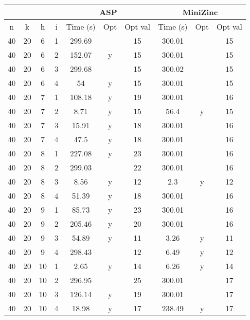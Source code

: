 \documentclass[12pt,a4paper,english,italian]{article}
\begin{document}
\begin{table}[]
	\begin{tabular}{cccc|ccc|ccc|}
		\cline{5-10}
		&    &    &   & \multicolumn{3}{c|}{ASP} & \multicolumn{3}{c|}{MiniZinc} \\ \hline
		n  & k  & h  & i & Time (s) & Opt & Opt val & Time (s)   & Opt   & Opt val  \\ \hline
		40 & 20 & 6  & 1 & 299.69   &     & 15      & 300.01     &       & 15       \\ \hline
		40 & 20 & 6  & 2 & 152.07   & y   & 15      & 300.01     &       & 15       \\ \hline
		40 & 20 & 6  & 3 & 299.68   &     & 15      & 300.02     &       & 15       \\ \hline
		40 & 20 & 6  & 4 & 54       & y   & 15      & 300.01     &       & 15       \\ \hline
		40 & 20 & 7  & 1 & 108.18   & y   & 19      & 300.01     &       & 16       \\ \hline
		40 & 20 & 7  & 2 & 8.71     & y   & 15      & 56.4       & y     & 15       \\ \hline
		40 & 20 & 7  & 3 & 15.91    & y   & 18      & 300.01     &       & 16       \\ \hline
		40 & 20 & 7  & 4 & 47.5     & y   & 18      & 300.01     &       & 16       \\ \hline
		40 & 20 & 8  & 1 & 227.08   & y   & 23      & 300.01     &       & 16       \\ \hline
		40 & 20 & 8  & 2 & 299.03   &     & 22      & 300.01     &       & 16       \\ \hline
		40 & 20 & 8  & 3 & 8.56     & y   & 12      & 2.3        & y     & 12       \\ \hline
		40 & 20 & 8  & 4 & 51.39    & y   & 18      & 300.01     &       & 16       \\ \hline
		40 & 20 & 9  & 1 & 85.73    & y   & 23      & 300.01     &       & 16       \\ \hline
		40 & 20 & 9  & 2 & 205.46   & y   & 20      & 300.01     &       & 16       \\ \hline
		40 & 20 & 9  & 3 & 54.89    & y   & 11      & 3.26       & y     & 11       \\ \hline
		40 & 20 & 9  & 4 & 298.43   &     & 12      & 6.49       & y     & 12       \\ \hline
		40 & 20 & 10 & 1 & 2.65     & y   & 14      & 6.26       & y     & 14       \\ \hline
		40 & 20 & 10 & 2 & 296.95   &     & 25      & 300.01     &       & 17       \\ \hline
		40 & 20 & 10 & 3 & 126.14   & y   & 19      & 300.01     &       & 17       \\ \hline
		40 & 20 & 10 & 4 & 18.98    & y   & 17      & 238.49     & y     & 17       \\ \hline
	\end{tabular}
\end{table}
\end{document}
